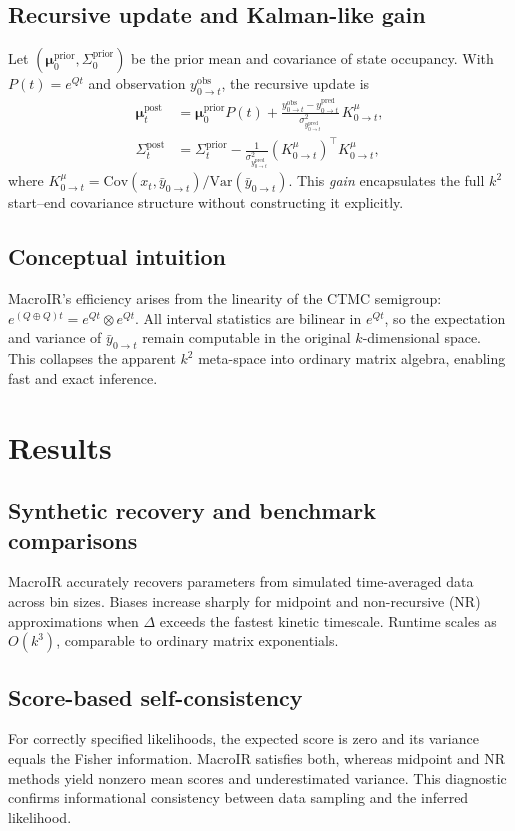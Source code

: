 \documentclass[9pt]{elife}
\begin{document}
\subsection*{Recursive update and Kalman-like gain}
Let $(\bm{\mu}^{\mathrm{prior}}_0,\Sigma^{\mathrm{prior}}_0)$ be the prior mean and covariance of state occupancy. With $P(t)=e^{Qt}$ and observation $y^{\mathrm{obs}}_{0\to t}$, the recursive update is
\begin{align}
\bm{\mu}^{\mathrm{post}}_{t} &= \bm{\mu}^{\mathrm{prior}}_0 P(t) + \frac{y^{\mathrm{obs}}_{0\to t}-y^{\mathrm{pred}}_{0\to t}}{\sigma^2_{y^{\mathrm{pred}}_{0\to t}}}\,K^\mu_{0\to t},\\
\Sigma^{\mathrm{post}}_{t} &= \Sigma^{\mathrm{prior}}_{t} - \frac{1}{\sigma^2_{y^{\mathrm{pred}}_{0\to t}}}(K^\mu_{0\to t})^\top K^\mu_{0\to t},
\end{align}
where $K^\mu_{0\to t} = \mathrm{Cov}(x_t,\bar y_{0\to t})/\mathrm{Var}(\bar y_{0\to t})$. This \emph{gain} encapsulates the full $k^2$ start--end covariance structure without constructing it explicitly.

\subsection*{Conceptual intuition}
MacroIR’s efficiency arises from the linearity of the CTMC semigroup: $e^{(Q\oplus Q)t}=e^{Qt}\otimes e^{Qt}$. All interval statistics are bilinear in $e^{Qt}$, so the expectation and variance of $\bar y_{0\to t}$ remain computable in the original $k$-dimensional space. This collapses the apparent $k^2$ meta-space into ordinary matrix algebra, enabling fast and exact inference.

\section*{Results}
\subsection*{Synthetic recovery and benchmark comparisons}
MacroIR accurately recovers parameters from simulated time-averaged data across bin sizes. Biases increase sharply for midpoint and non-recursive (NR) approximations when $\Delta$ exceeds the fastest kinetic timescale. Runtime scales as $O(k^3)$, comparable to ordinary matrix exponentials.

\subsection*{Score-based self-consistency}
For correctly specified likelihoods, the expected score is zero and its variance equals the Fisher information. MacroIR satisfies both, whereas midpoint and NR methods yield nonzero mean scores and underestimated variance. This diagnostic confirms informational consistency between data sampling and the inferred likelihood.
\end{document}
